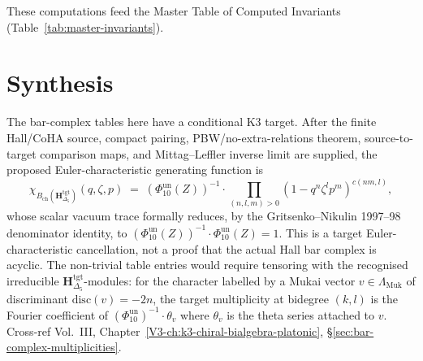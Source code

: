 \medskip

\noindent
These computations feed the Master Table of Computed Invariants
(Table~\ref{tab:master-invariants}).

\section{Synthesis}
\label{sec:bct-supplement}

\begin{remark}
\label{rem:bct-1}
The bar-complex tables here have a conditional K3 target.  After the
finite Hall/CoHA source, compact pairing, PBW/no-extra-relations
theorem, source-to-target comparison maps, and Mittag--Leffler
inverse limit are supplied, the proposed Euler-characteristic
generating function is
\[
\chi_{B_{\mathrm{ch}}(\mathbf H_{\Delta_5}^{\mathrm{tgt}})}(q,\zeta,p) \;=\; (\Phi_{10}^{\mathrm{un}}(Z))^{-1} \cdot \prod_{(n,l,m)>0}(1 - q^n\zeta^l p^m)^{c(nm,l)},
\]
whose scalar vacuum trace formally reduces, by the
Gritsenko--Nikulin 1997--98 denominator identity, to
$(\Phi_{10}^{\mathrm{un}}(Z))^{-1}\cdot\Phi_{10}^{\mathrm{un}}(Z)=1$.
This is a target Euler-characteristic cancellation, not a proof that
the actual Hall bar complex is acyclic.  The non-trivial table entries
would require tensoring with the recognised irreducible
$\mathbf H_{\Delta_5}^{\mathrm{tgt}}$-modules: for the character
labelled by a Mukai vector $v\in\Lambda_{\mathrm{Muk}}$ of
discriminant $\mathrm{disc}(v) = -2n$, the target multiplicity at
bidegree $(k,l)$ is the Fourier coefficient of
$(\Phi_{10}^{\mathrm{un}})^{-1}\cdot\theta_v$
where $\theta_v$ is the theta series attached to $v$. Cross-ref Vol.~III,
Chapter~\ref{V3-ch:k3-chiral-bialgebra-platonic},
\S\ref{sec:bar-complex-multiplicities}.
\end{remark}
